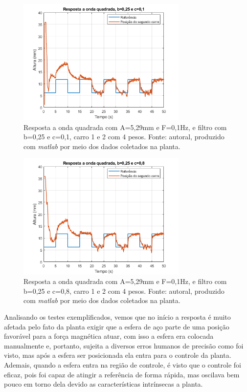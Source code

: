 \documentclass{ifacconf}
\begin{document}
\begin{figure}[!htb]
  \begin{center}
  \includegraphics[width=8.4cm]{figures/resultado_teste4.png}    %
  \caption{Resposta a onda quadrada com A=5,29mm e F=0,1Hz, e filtro com b=0,25 e c=0,1, carro 1 e 2 com 4 pesos. Fonte: autoral, produzido com \textit{matlab} por meio dos dados coletados na planta.} 
  \label{fig:teste4}
  \end{center}
\end{figure}

\begin{figure}[!htb]
  \begin{center}
  \includegraphics[width=8.4cm]{figures/resultado_teste5.png}    %
  \caption{Resposta a onda quadrada com A=5,29mm e F=0,1Hz, e filtro com b=0,25 e c=0,8, carro 1 e 2 com 4 pesos. Fonte: autoral, produzido com \textit{matlab} por meio dos dados coletados na planta.} 
  \label{fig:teste5}
  \end{center}
\end{figure}

Analisando os testes exemplificados, vemos que no início a resposta é muito afetada pelo fato da planta exigir que a esfera de aço parte de uma posição favorável para a força magnética atuar, com isso a esfera 
era colocada manualmente e, portanto, sujeita a diversos erros humanos de precisão como foi visto, mas após a esfera ser posicionada ela entra para o controle da planta.
Ademais, quando a esfera entra na região de controle, é visto que o controle foi eficaz, pois foi capaz de atingir a referência de forma rápida, mas oscilava bem pouco em torno dela devido as características
intrínsecas a planta. 
\end{document}
